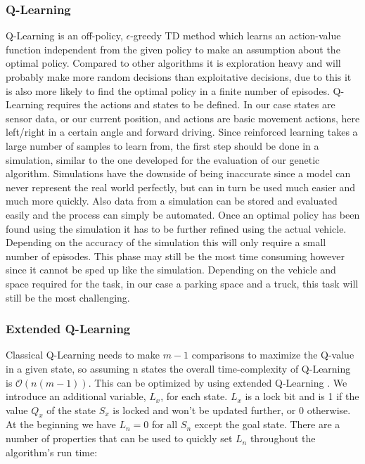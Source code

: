 \subsubsection{Q-Learning}
\label{sec:q-learning}

Q-Learning is an off-policy, $\epsilon$-greedy TD method which learns an action-value function independent from the given policy to make an assumption about the optimal policy. Compared to other algorithms it is exploration heavy and will probably make more random decisions than exploitative decisions, due to this it is also more likely to find the optimal policy in a finite number of episodes. Q-Learning requires the actions and states to be defined. In our case states are sensor data, or our current position, and actions are basic movement actions, here left/right in a certain angle and forward driving. Since reinforced learning takes a large number of samples to learn from, the first step should be done in a simulation, similar to the one developed for the evaluation of our genetic algorithm. Simulations have the downside of being inaccurate since a model can never represent the real world perfectly, but can in turn be used much easier and much more quickly. Also data from a simulation can be stored and evaluated easily and the process can simply be automated. Once an optimal policy has been found using the simulation it has to be further refined using the actual vehicle. Depending on the accuracy of the simulation this will only require a small number of episodes. This phase may still be the most time consuming however since it cannot be sped up like the simulation. Depending on the vehicle and space required for the task, in our case a parking space and a truck, this task will still be the most challenging.

\subsubsection{Extended Q-Learning}
\label{sec:extended-q-learning}
Classical Q-Learning needs to make $m-1$ comparisons to maximize the Q-value in a given state, so assuming n states the overall time-complexity of Q-Learning is $\mathcal O(n(m-1))$. This can be optimized by using extended Q-Learning \cite{11}. We introduce an additional variable, $L_x$, for each state. $L_x$ is a lock bit and is 1 if the value $Q_x$ of the state $S_x$ is locked and won't be updated further, or 0 otherwise. At the beginning we have $L_n=0$ for all $S_n$ except the goal state. There are a number of properties that can be used to quickly set $L_n$ throughout the algorithm's run time: 

